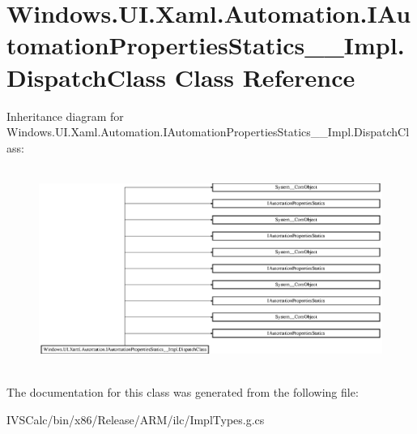 \hypertarget{class_windows_1_1_u_i_1_1_xaml_1_1_automation_1_1_i_automation_properties_statics_____impl_1_1_dispatch_class}{}\section{Windows.\+U\+I.\+Xaml.\+Automation.\+I\+Automation\+Properties\+Statics\+\_\+\+\_\+\+Impl.\+Dispatch\+Class Class Reference}
\label{class_windows_1_1_u_i_1_1_xaml_1_1_automation_1_1_i_automation_properties_statics_____impl_1_1_dispatch_class}
Inheritance diagram for Windows.\+U\+I.\+Xaml.\+Automation.\+I\+Automation\+Properties\+Statics\+\_\+\+\_\+\+Impl.\+Dispatch\+Class\+:\begin{figure}[H]
\begin{center}
\leavevmode
\includegraphics[height=6.595289cm]{class_windows_1_1_u_i_1_1_xaml_1_1_automation_1_1_i_automation_properties_statics_____impl_1_1_dispatch_class}
\end{center}
\end{figure}


The documentation for this class was generated from the following file\+:\begin{DoxyCompactItemize}
\item 
I\+V\+S\+Calc/bin/x86/\+Release/\+A\+R\+M/ilc/Impl\+Types.\+g.\+cs\end{DoxyCompactItemize}
